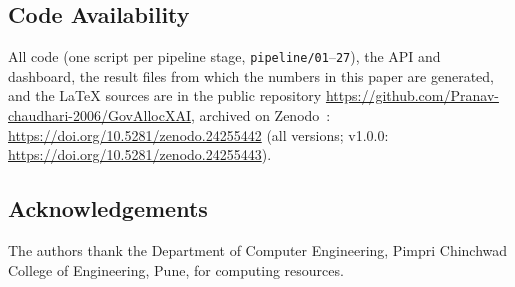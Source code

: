 \documentclass[11pt,a4paper]{article}
\DeclareRobustCommand*{\_}{\textunderscore\hskip0pt\relax}
\begin{document}
\subsection*{Code Availability}
All code (one script per pipeline stage, \texttt{pipeline/01}--\texttt{27}), the API and dashboard, the result files from which the numbers in this paper are generated, and the LaTeX sources are in the public repository \url{https://github.com/Pranav-chaudhari-2006/GovAllocXAI}, archived on Zenodo~\cite{chaudhari2026code}: \url{https://doi.org/10.5281/zenodo.24255442} (all versions; v1.0.0: \url{https://doi.org/10.5281/zenodo.24255443}).

\subsection*{Acknowledgements}
The authors thank the Department of Computer Engineering, Pimpri Chinchwad College of Engineering, Pune, for computing resources.



\end{document}
